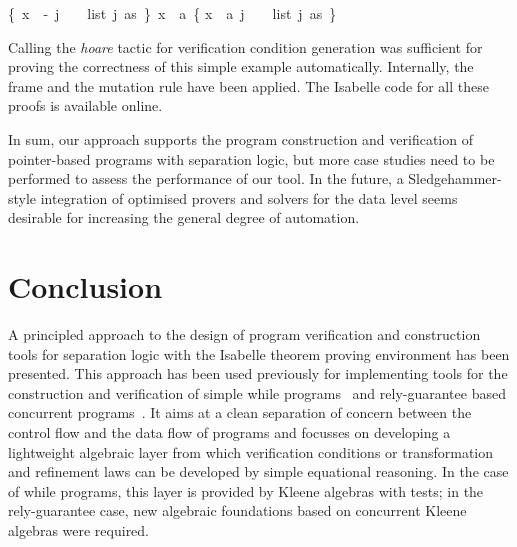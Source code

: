 \documentclass[twoside,runningheads,envcountsame,envcountsect,oribibl,orivec]{llncs}
\begin{document}
\begin{center}
\begin{isabellebody}
{\isachardoublequoteopen}{\isasymturnstile}\{\ x\ {\isacharbrackleft}{\isasymmapsto}{\isacharbrackright}\ {\isacharbrackleft}-{\isacharcomma}\ j{\isacharbrackright}\  \ {\isacharasterisk}\  \ list\ j\ as\  \}\ {\isacharat}x\ {\isacharcolon}{\isacharequal}\ a\ \{ x\ {\isacharbrackleft}{\isasymmapsto}{\isacharbrackright}\ {\isacharbrackleft}a{\isacharcomma}\ j{\isacharbrackright}\  \ {\isacharasterisk}\ \ list\ j\ as\  \} {\isachardoublequoteclose}
\end{isabellebody}
\end{center}
Calling the \emph{hoare} tactic for verification condition generation
was sufficient for proving the correctness of this simple example
automatically.  Internally, the frame and the mutation rule have been
applied.
The Isabelle code for all these proofs is available online.

In sum, our approach supports the program construction and
verification of pointer-based programs with separation logic, but more
case studies need to be performed to assess the performance of our
tool. In the future, a Sledgehammer-style integration of optimised
provers and solvers for the data level seems desirable for increasing
the general degree of automation.



\section{Conclusion}\label{S:conclusion}

A principled approach to the design of program verification and
construction tools for separation logic with the Isabelle theorem
proving environment has been presented. This approach has been used
previously for implementing tools for the construction and
verification of simple while programs~\cite{sefm2014} and rely-guarantee
based concurrent programs~\cite{fm2014}. It aims at a clean separation of
concern between the control flow and the data flow of programs and
focusses on developing a lightweight algebraic layer from which
verification conditions or transformation and refinement laws can be
developed by simple equational reasoning. In the case of while
programs, this layer is provided by Kleene algebras with
tests; in the rely-guarantee case, new algebraic
foundations based on concurrent Kleene algebras were required.
\end{document}

